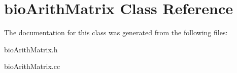 \hypertarget{classbio_arith_matrix}{}\section{bio\+Arith\+Matrix Class Reference}
\label{classbio_arith_matrix}


The documentation for this class was generated from the following files\+:\begin{DoxyCompactItemize}
\item 
bio\+Arith\+Matrix.\+h\item 
bio\+Arith\+Matrix.\+cc\end{DoxyCompactItemize}
